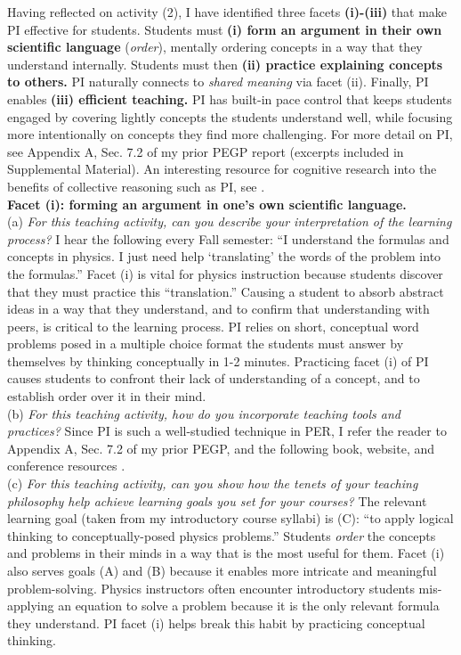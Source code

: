 \documentclass[../../../main.tex]{subfiles}
\begin{document}
Having reflected on activity (2), I have identified three facets \textbf{(i)-(iii)} that make PI effective for students.  Students must \textbf{(i) form an argument in their own scientific language} (\textit{order}), mentally ordering concepts in a way that they understand internally.  Students must then \textbf{(ii) practice explaining concepts to others.}  PI naturally connects to \textit{shared meaning} via facet (ii).  Finally, PI enables \textbf{(iii) efficient teaching.}  PI has built-in pace control that keeps students engaged by covering lightly concepts the students understand well, while focusing more intentionally on concepts they find more challenging.  For more detail on PI, see Appendix A, Sec. 7.2 of my prior PEGP report (excerpts included in Supplemental Material).  An interesting resource for cognitive research into the benefits of collective reasoning such as PI, see \cite{infotopia}.
\\
\vspace{0.15cm}
\textbf{Facet (i): forming an argument in one's own scientific language.}
\\
\vspace{0.15cm}
(a) \textit{For this teaching activity, can you describe your interpretation of the learning process?}  I hear the following every Fall semester: ``I understand the formulas and concepts in physics.  I just need help `translating' the words of the problem into the formulas.''  Facet (i) is vital for physics instruction because students discover that they must practice this ``translation.''  Causing a student to absorb abstract ideas in a way that they understand, and to confirm that understanding with peers, is critical to the learning process.  PI relies on short, conceptual word problems posed in a multiple choice format the students must answer by themselves by thinking conceptually in 1-2 minutes.  Practicing facet (i) of PI causes students to confront their lack of understanding of a concept, and to establish order over it in their mind.
\\
\vspace{0.15cm}
(b) \textit{For this teaching activity, how do you incorporate teaching tools and practices?}  Since PI is such a well-studied technique in PER, I refer the reader to Appendix A, Sec. 7.2 of my prior PEGP, and the following book, website, and conference resources \cite{mazur2013peer,infotopia,PhysPort,AAPTPI}.
\\
\vspace{0.15cm}
(c) \textit{For this teaching activity, can you show how the tenets of your teaching philosophy help achieve learning goals you set for your courses?}  The relevant learning goal (taken from my introductory course syllabi) is (C): ``to apply logical thinking to conceptually-posed physics problems.''  Students \textit{order} the concepts and problems in their minds in a way that is the most useful for them.  Facet (i) also serves goals (A) and (B) because it enables more intricate and meaningful problem-solving.  Physics instructors often encounter introductory students mis-applying an equation to solve a problem because it is the only relevant formula they understand.  PI facet (i) helps break this habit by practicing conceptual thinking.
\end{document}
